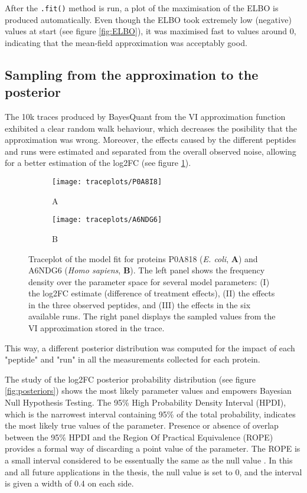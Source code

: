 After the \texttt{.fit()} method is run, a plot of the maximisation of the \ac{ELBO} is produced automatically. Even though the ELBO took extremely low (negative) values at start (see figure \ref{fig:ELBO}), it was maximised fast to values around 0, indicating that the mean-field approximation was acceptably good.


\subsection{Sampling from the approximation to the posterior}
\label{subsec:basic_model}


The 10k traces produced by BayesQuant from the \ac{VI} approximation function exhibited a clear random walk behaviour, which decreases the posibility that the approximation was wrong. Moreover, the  effects caused by the different peptides and runs were estimated and separated from the overall observed noise, allowing for a better estimation of the \ac{log2FC} (see figure \ref{fig:traceplots}).

\begin{figure}[!h]
\begin{subfigure}{\textwidth}
\centering
\caption*{A}
\texttt{[image: traceplots/P0A8I8]}
\end{subfigure}
\bigskip
\begin{subfigure}{\textwidth}
\centering
\caption*{B}
\texttt{[image: traceplots/A6NDG6]}
\end{subfigure}
\caption[Traceplots for 2 proteins]{Traceplot of the model fit for proteins P0A818 (\textit{E. coli}, \textbf{A}) and A6NDG6 (\textit{Homo sapiens}, \textbf{B}). The left panel shows the frequency density over the parameter space for several model parameters: (I) the \ac{log2FC} estimate (difference of treatment effects), (II) the effects in the three observed peptides, and (III) the effects in the six available runs. The right panel displays the sampled values from the \ac{VI} approximation stored in the trace.}
\label{fig:traceplots}
\end{figure}

This way, a different posterior distribution was computed for the impact of each "peptide" and "run" in all the measurements collected for each protein.


The study of the \ac{log2FC} posterior probability distribution (see figure \ref{fig:posteriors}) shows the most likely parameter values and empowers Bayesian Null Hypothesis Testing. The 95\% High Probability Density Interval (\ac{HPDI}), which is the narrowest interval containing 95\% of the total probability, indicates the most likely true values of the parameter. Presence or absence of overlap between the 95\% \ac{HPDI} and the Region Of Practical Equivalence (\ac{ROPE}) provides a formal way of discarding a point value of the parameter. The \ac{ROPE} is a small interval considered to be essentually the same as the null value \cite{Kruschke}. In this and all future applications in the thesis, the null value is set to 0, and the interval is given a width of 0.4 on each side.

